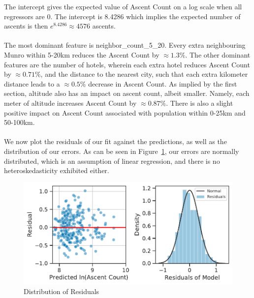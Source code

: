 \documentclass[11pt,a4paper]{article}
\begin{document}
The intercept gives the expected value of Ascent Count on a log scale when all regressors are 0. The intercept is 8.4286 which implies the expected number of ascents is then $e^{8.4286} \approx 4576$ ascents. \\ \\ 
The most dominant feature is neighbor\_count\_5\_20. Every extra neighbouring Munro within 5-20km reduces the Ascent Count by $ \approx 1.3\%$. The other dominant features are the number of hotels, wherein each extra hotel reduces Ascent Count by $\approx 0.71\%$, and the distance to the nearest city, such that each extra kilometer distance leads to a $\approx 0.5\%$ decrease in Ascent Count. As implied by the first section, altitude also has an impact on ascent count, albeit smaller. Namely, each meter of altitude increases Ascent Count by $\approx 0.87\%$. There is also a slight positive impact on Ascent Count associated with population within 0-25km and 50-100km. \\ \\
We now plot the residuals of our fit against the predictions, as well as the distribution of our errors. As can be seen in Figure~\ref{fds-project-template:fig:multi_residuals_dist}, our errors are normally distributed, which is an assumption of linear regression, and there is no heteroskedasticity exhibited either.
\begin{figure} [h!]
  \centering
  \includegraphics{report/multi_residuals_dist.pdf}
  \caption{Distribution of Residuals}
  \label{fds-project-template:fig:multi_residuals_dist}
\end{figure} \\ \\
\end{document}
